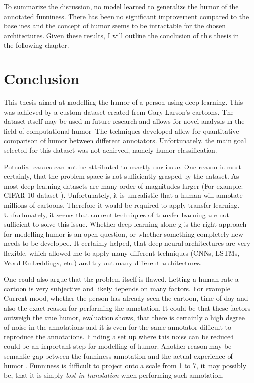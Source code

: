 \documentclass[draft,final,oneside]{vutinfth} %
\begin{document}
To summarize the discussion, no model learned to generalize the humor of the annotated funniness. There has been no significant improvement compared to the baselines and the concept of humor seems to be intractable for the chosen architectures. Given these results, I will outline the conclusion of this thesis in the following chapter. 


\chapter {Conclusion}

This thesis aimed at modelling the humor of a person using deep learning. This was achieved by a custom dataset created from Gary Larson's cartoons. The dataset itself may be used in future research and allows for novel analysis in the field of computational humor. The techniques developed allow for quantitative comparison of humor between different annotators. Unfortunately, the main goal selected for this dataset was not achieved, namely humor classification.

Potential causes can not be attributed to exactly one issue. One reason is most certainly, that the problem space is not sufficiently grasped by the dataset. As most deep learning datasets are many order of magnitudes larger (For example: CIFAR 10 dataset \cite{dogsvscats}). Unfortunately, it is unrealistic that a human will annotate millions of cartoons. Therefore it would be required to apply transfer learning. Unfortunately, it seems that current techniques of transfer learning are not sufficient to solve this issue. Whether deep learning alone g is the right approach for modelling humor is an open question, or whether something completely new needs to be developed. It certainly helped, that deep neural architectures are very flexible, which allowed me to apply many different techniques (CNNs, LSTMs, Word Embeddings, etc.) and try out many different architectures.

One could also argue that the problem itself is flawed. Letting a human rate a
cartoon is very subjective and likely depends on many factors. For example: Current mood, whether the person has already seen the cartoon, time of day and also the exact reason for performing the annotation. It could be that these factors outweigh the true humor, evaluation shows, that there is certainly a high degree of noise in the annotations and it is even for the same annotator difficult to reproduce the annotations. Finding a set up where this noise can be reduced could be an important step for modelling of humor. Another reason may be semantic gap between the funniness annotation and the actual experience of humor \cite{semanticgap}. Funniness is difficult to project onto a scale from 1 to 7, it may possibly be, that it is simply \textit{lost in translation} when performing such annotation.
\end{document}
